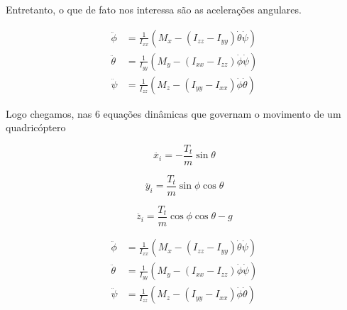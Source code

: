 Entretanto, o que de fato nos interessa são as acelerações angulares.

\begin{align*}
	\ddot{\phi} &= \frac{1}{I_{xx}} \left( M_x - (I_{zz} - I_{yy}) \dot{\theta} \dot{\psi} \right) \\
	\ddot{\theta} &= \frac{1}{I_{yy}} \left( M_y - (I_{xx} - I_{zz}) \dot{\phi} \dot{\psi} \right) \\
	\ddot{\psi} &= \frac{1}{I_{zz}} \left( M_z - (I_{yy} - I_{xx}) \dot{\phi} \dot{\theta} \right)
\end{align*}

Logo chegamos, nas 6 equações dinâmicas que governam o movimento de um quadricóptero


\[
\ddot{x_i} = -\frac{T_t}{m} \sin\theta
\]

\[
\ddot{y_i} = \frac{T_t}{m} \sin\phi \cos\theta
\]

\[
\ddot{z_i} = \frac{T_t}{m} \cos\phi \cos\theta - g
\]


\begin{align*}
	\ddot{\phi} &= \frac{1}{I_{xx}} \left( M_x - (I_{zz} - I_{yy}) \dot{\theta} \dot{\psi} \right) \\
	\ddot{\theta} &= \frac{1}{I_{yy}} \left( M_y - (I_{xx} - I_{zz}) \dot{\phi} \dot{\psi} \right) \\
	\ddot{\psi} &= \frac{1}{I_{zz}} \left( M_z - (I_{yy} - I_{xx}) \dot{\phi} \dot{\theta} \right)
\end{align*}
